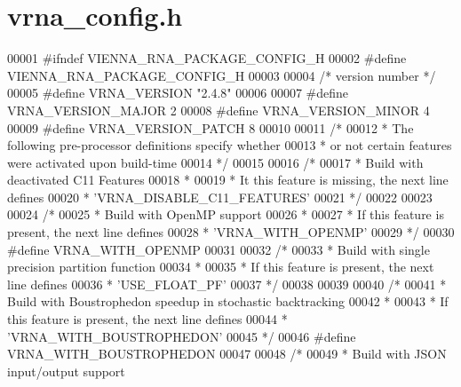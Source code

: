 \hypertarget{vrna__config_8h_source}{}\section{vrna\+\_\+config.\+h}
\label{vrna__config_8h_source}

\begin{DoxyCode}
00001 \textcolor{preprocessor}{#ifndef VIENNA\_RNA\_PACKAGE\_CONFIG\_H}
00002 \textcolor{preprocessor}{#define VIENNA\_RNA\_PACKAGE\_CONFIG\_H}
00003 
00004 \textcolor{comment}{/* version number */}
00005 \textcolor{preprocessor}{#define VRNA\_VERSION  "2.4.8"}
00006 
00007 \textcolor{preprocessor}{#define VRNA\_VERSION\_MAJOR  2}
00008 \textcolor{preprocessor}{#define VRNA\_VERSION\_MINOR  4}
00009 \textcolor{preprocessor}{#define VRNA\_VERSION\_PATCH  8}
00010 
00011 \textcolor{comment}{/*}
00012 \textcolor{comment}{ * The following pre-processor definitions specify whether}
00013 \textcolor{comment}{ * or not certain features were activated upon build-time}
00014 \textcolor{comment}{ */}
00015 
00016 \textcolor{comment}{/*}
00017 \textcolor{comment}{ * Build with deactivated C11 Features}
00018 \textcolor{comment}{ *}
00019 \textcolor{comment}{ * It this feature is missing, the next line defines}
00020 \textcolor{comment}{ * 'VRNA\_DISABLE\_C11\_FEATURES'}
00021 \textcolor{comment}{ */}
00022 
00023 
00024 \textcolor{comment}{/*}
00025 \textcolor{comment}{ * Build with OpenMP support}
00026 \textcolor{comment}{ *}
00027 \textcolor{comment}{ * If this feature is present, the next line defines}
00028 \textcolor{comment}{ * 'VRNA\_WITH\_OPENMP'}
00029 \textcolor{comment}{ */}
00030 \textcolor{preprocessor}{#define VRNA\_WITH\_OPENMP}
00031 
00032 \textcolor{comment}{/*}
00033 \textcolor{comment}{ * Build with single precision partition function}
00034 \textcolor{comment}{ *}
00035 \textcolor{comment}{ * If this feature is present, the next line defines}
00036 \textcolor{comment}{ * 'USE\_FLOAT\_PF'}
00037 \textcolor{comment}{ */}
00038 
00039 
00040 \textcolor{comment}{/*}
00041 \textcolor{comment}{ * Build with Boustrophedon speedup in stochastic backtracking}
00042 \textcolor{comment}{ *}
00043 \textcolor{comment}{ * If this feature is present, the next line defines}
00044 \textcolor{comment}{ * 'VRNA\_WITH\_BOUSTROPHEDON'}
00045 \textcolor{comment}{ */}
00046 \textcolor{preprocessor}{#define VRNA\_WITH\_BOUSTROPHEDON}
00047 
00048 \textcolor{comment}{/*}
00049 \textcolor{comment}{ * Build with JSON input/output support}

\end{DoxyCode}
